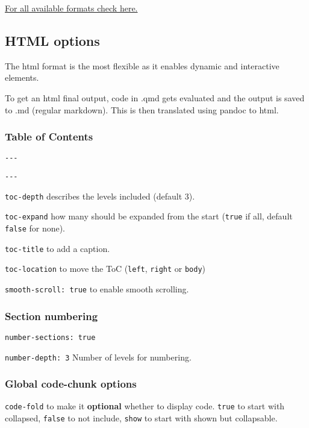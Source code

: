 \documentclass[
  letterpaper,
  DIV=11,
  numbers=noendperiod]{scrartcl}
\begin{document}
\href{https://quarto.org/docs/output-formats/all-formats.html}{For all
available formats check here.}

\hypertarget{html-options}{%
\subsection{HTML options}\label{html-options}}

The html format is the most flexible as it enables dynamic and
interactive elements.

To get an html final output, code in .qmd gets evaluated and the output
is saved to .md (regular markdown). This is then translated using pandoc
to html.

\hypertarget{table-of-contents}{%
\subsubsection{Table of Contents}\label{table-of-contents}}

\texttt{-\/-\/-}

\texttt{-\/-\/-}

\texttt{toc-depth} describes the levels included (default 3).

\texttt{toc-expand} how many should be expanded from the start
(\texttt{true} if all, default \texttt{false} for none).

\texttt{toc-title} to add a caption.

\texttt{toc-location} to move the ToC (\texttt{left}, \texttt{right} or
\texttt{body})

\texttt{smooth-scroll:\ true} to enable smooth scrolling.

\hypertarget{section-numbering}{%
\subsubsection{Section numbering}\label{section-numbering}}

\texttt{number-sections:\ true}

\texttt{number-depth:\ 3} Number of levels for numbering.

\hypertarget{global-code-chunk-options}{%
\subsubsection{Global code-chunk
options}\label{global-code-chunk-options}}

\texttt{code-fold} to make it \textbf{optional} whether to display code.
\texttt{true} to start with collapsed, \texttt{false} to not include,
\texttt{show} to start with shown but collapsable.
\end{document}
